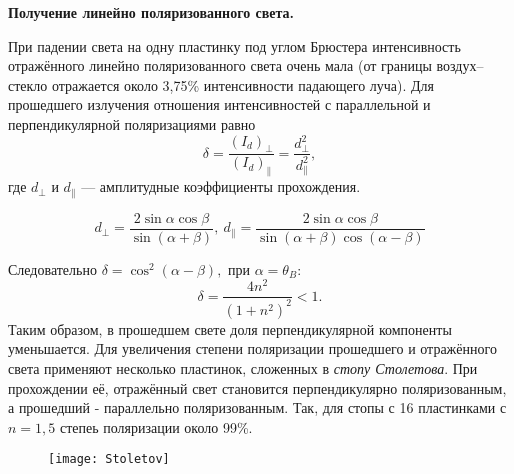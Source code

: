 \textbf{Получение линейно поляризованного света.}

При падении света на одну пластинку под углом Брюстера интенсивность отражённого линейно поляризованного света очень мала (от границы воздух--стекло отражается около 3,75\% интенсивности падающего луча). Для прошедшего излучения отношения интенсивностей с параллельной и перпендикулярной поляризациями равно $$\delta = \frac{(I_d)_\perp}{(I_d)_\parallel} = \frac{d^2_\perp}{d^2_\parallel},$$
где $d_\perp$ и $d_\parallel$ --- амплитудные коэффициенты прохождения.

$$d_\perp = \frac{2\sin{\alpha}\cos{\beta}}{\sin{(\alpha + \beta)}}, \ d_\parallel = \frac{2\sin{\alpha}\cos{\beta}}{\sin{(\alpha+\beta)}\cos{(\alpha - \beta)}}$$

Следовательно $\delta = \cos^2{(\alpha - \beta)},$ при $\alpha = \theta_B$: $$\delta = \frac{4n^2}{(1+n^2)^2} < 1.$$ 
Таким образом, в прошедшем свете доля перпендикулярной компоненты уменьшается. Для увеличения степени поляризации прошедшего и отражённого света применяют несколько пластинок, сложенных в \textit{стопу Столетова}. При прохождении её, отражённый свет становится перпендикулярно поляризованным, а прошедший - параллельно поляризованным. Так, для стопы с 16 пластинками с $n = 1,5$ степеь поляризации около 99\%.

	\begin{figure}[H]
	\centering
	\texttt{[image: Stoletov]}
    \end{figure}